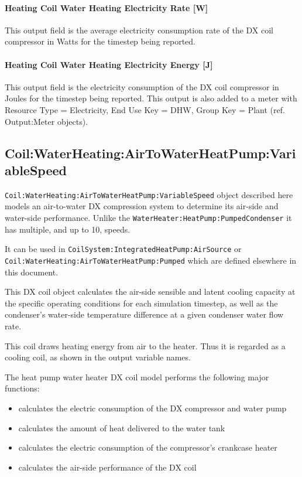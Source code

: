 \paragraph{Heating Coil Water Heating Electricity Rate {[}W{]}}\label{heating-coil-water-heating-electric-powerw-1}

This output field is the average electricity consumption rate of the DX coil compressor in Watts for the timestep being reported.

\paragraph{Heating Coil Water Heating Electricity Energy {[}J{]}}\label{heating-coil-water-heating-electric-energy-j-1}

This output field is the electricity consumption of the DX coil compressor in Joules for the timestep being reported. This output is also added to a meter with Resource Type = Electricity, End Use Key = DHW, Group Key = Plant (ref. Output:Meter objects).



\subsection{Coil:WaterHeating:AirToWaterHeatPump:VariableSpeed}\label{coil-waterheating-airtowaterheatpump-variablespeed}

\lstinline!Coil:WaterHeating:AirToWaterHeatPump:VariableSpeed! object described here models an air-to-water DX compression system to determine its air-side and water-side performance.
Unlike the \lstinline!WaterHeater:HeatPump:PumpedCondenser! it has multiple, and up to 10, speeds.

It can be used in \lstinline!CoilSystem:IntegratedHeatPump:AirSource! or \lstinline!Coil:WaterHeating:AirToWaterHeatPump:Pumped! which are defined elsewhere in this document.

This DX coil object calculates the air-side sensible and latent cooling capacity at the specific operating conditions for each simulation timestep, as well as the condenser's water-side temperature difference at a given condenser water flow rate.

This coil draws heating energy from air to the heater. Thus it is regarded as a cooling coil, as shown in the output variable names.

The heat pump water heater DX coil model performs the following major functions:

\begin{itemize}
\item
  calculates the electric consumption of the DX compressor and water pump
\item
  calculates the amount of heat delivered to the water tank
\item
  calculates the electric consumption of the compressor's crankcase heater
\item
  calculates the air-side performance of the DX coil
\end{itemize}

